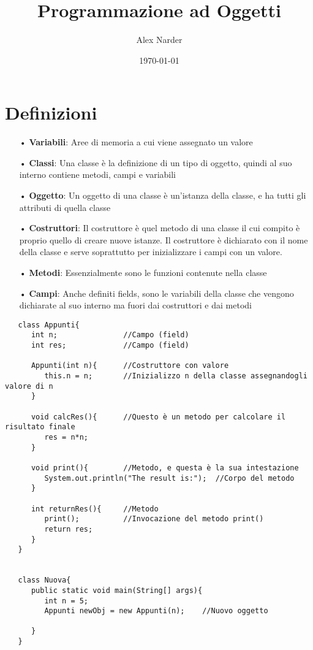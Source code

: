 \documentclass{article}
\title{Programmazione ad Oggetti}
\author{Alex Narder}
\date{\today}
\begin{document}
\maketitle

\section{Definizioni}

\begin{itemize}
   \item[•] \textbf{Variabili}: Aree di memoria a cui viene assegnato un valore
   \item[•] \textbf{Classi}: Una classe è la definizione di un tipo di oggetto, quindi al suo interno contiene metodi, campi e variabili 
   \item[•] \textbf{Oggetto}: Un oggetto di una classe è un'istanza della classe, e ha tutti gli attributi di quella classe
   \item[•] \textbf{Costruttori}: Il costruttore è quel metodo di una classe il cui compito è proprio quello di creare nuove istanze. Il costruttore è dichiarato 
      con il nome della classe e serve soprattutto per inizializzare i campi con un valore.
   \item[•] \textbf{Metodi}: Essenzialmente sono le funzioni contenute nella classe
   \item[•] \textbf{Campi}: Anche definiti fields, sono le variabili della classe che vengono dichiarate al suo interno ma fuori dai costruttori e dai metodi 
\end{itemize}
\newpage
\begin{verbatim}
   class Appunti{
      int n;               //Campo (field)
      int res;             //Campo (field)

      Appunti(int n){      //Costruttore con valore 
         this.n = n;       //Inizializzo n della classe assegnandogli valore di n
      }   

      void calcRes(){      //Questo è un metodo per calcolare il risultato finale
         res = n*n;
      }

      void print(){        //Metodo, e questa è la sua intestazione 
         System.out.println("The result is:");  //Corpo del metodo
      }

      int returnRes(){     //Metodo
         print();          //Invocazione del metodo print()
         return res;
      }
   }


   class Nuova{
      public static void main(String[] args){
         int n = 5;
         Appunti newObj = new Appunti(n);    //Nuovo oggetto
      
      }
   }
\end{verbatim}
\end{document}
